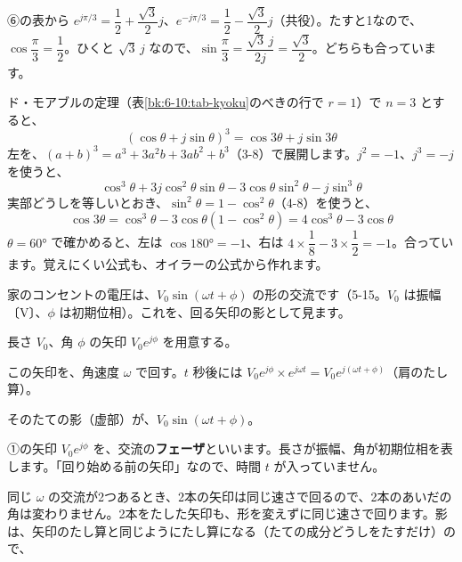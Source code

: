 ⑥の表から $e^{j\pi/3}=\dfrac{1}{2}+\dfrac{\sqrt3}{2}j$、$e^{-j\pi/3}=\dfrac{1}{2}-\dfrac{\sqrt3}{2}j$（共役）。たすと1なので、$\cos\dfrac{\pi}{3}=\dfrac{1}{2}$。ひくと $\sqrt3\,j$ なので、$\sin\dfrac{\pi}{3}=\dfrac{\sqrt3\,j}{2j}=\dfrac{\sqrt3}{2}$。どちらも合っています。


\begin{motto}[5]
ド・モアブルの定理（表\ref{bk:6-10:tab-kyoku}のべきの行で $r=1$）で $n=3$ とすると、
\[ (\cos\theta+j\sin\theta)^3=\cos3\theta+j\sin3\theta \]
左を、$(a+b)^3=a^3+3a^2b+3ab^2+b^3$（3-8）で展開します。$j^2=-1$、$j^3=-j$ を使うと、
\[ \cos^3\theta+3j\cos^2\theta\sin\theta-3\cos\theta\sin^2\theta-j\sin^3\theta \]
実部どうしを等しいとおき、$\sin^2\theta=1-\cos^2\theta$（4-8）を使うと、
\[ \cos3\theta=\cos^3\theta-3\cos\theta(1-\cos^2\theta)=4\cos^3\theta-3\cos\theta \]
$\theta=60°$ で確かめると、左は $\cos180°=-1$、右は $4\times\dfrac{1}{8}-3\times\dfrac{1}{2}=-1$。合っています。覚えにくい公式も、オイラーの公式から作れます。
\end{motto}


\label{bk:6-10:phasor}家のコンセントの電圧は、$V_0\sin(\omega t+\phi)$ の形の交流です（5-15。$V_0$ は振幅〔V〕、$\phi$ は初期位相）。これを、回る矢印の影として見ます。
\begin{enumerate}[label={\bkcircled[\bkTF]{\arabic*}}, leftmargin=2.4\zw, itemsep=2pt, topsep=2pt]
\item 長さ $V_0$、角 $\phi$ の矢印 $V_0e^{j\phi}$ を用意する。
\item この矢印を、角速度 $\omega$ で回す。$t$ 秒後には $V_0e^{j\phi}\times e^{j\omega t}=V_0e^{j(\omega t+\phi)}$（肩のたし算）。
\item そのたての影（虚部）が、$V_0\sin(\omega t+\phi)$。
\end{enumerate}
①の矢印 $V_0e^{j\phi}$ を、交流の\textbf{フェーザ}といいます。長さが振幅、角が初期位相を表します。「回り始める前の矢印」なので、時間 $t$ が入っていません。

同じ $\omega$ の交流が2つあるとき、2本の矢印は同じ速さで回るので、2本のあいだの角は変わりません。2本をたした矢印も、形を変えずに同じ速さで回ります。影は、矢印のたし算と同じようにたし算になる（たての成分どうしをたすだけ）ので、

